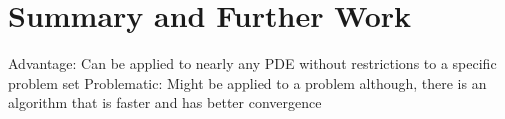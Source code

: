 \documentclass[./\jobname.tex]{subfiles}
\begin{document}
\chapter{Summary and Further Work}

Advantage: Can be applied to nearly any PDE without restrictions to a specific problem set
Problematic: Might be applied to a problem although, there is an algorithm that is faster and has better convergence
\end{document}

